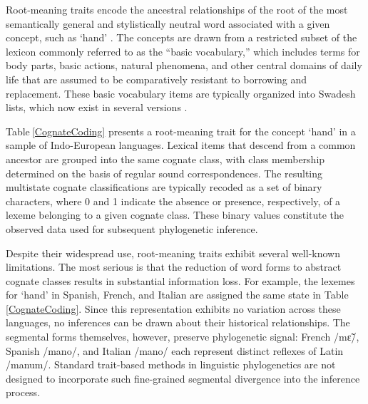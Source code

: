 \documentclass[numsec,webpdf,modern,large,namedate]{oup-authoring-template}
\begin{document}
Root-meaning traits encode the ancestral relationships of the root of the most semantically general and stylistically neutral word associated with a given concept, such as ‘hand’ \citep{Heggarty2023}. The concepts are drawn from a restricted subset of the lexicon commonly referred to as the “basic vocabulary,” which includes terms for body parts, basic actions, natural phenomena, and other central domains of daily life that are assumed to be comparatively resistant to borrowing and replacement. These basic vocabulary items are typically organized into Swadesh lists, which now exist in several versions \citep{Tadmor2010}. 

Table$~$\ref{CognateCoding} presents a root-meaning trait for the concept ‘hand’ in a sample of Indo-European languages. Lexical items that descend from a common ancestor are grouped into the same cognate class, with class membership determined on the basis of regular sound correspondences. The resulting multistate cognate classifications are typically recoded as a set of binary characters, where 0 and 1 indicate the absence or presence, respectively, of a lexeme belonging to a given cognate class. These binary values constitute the observed data used for subsequent phylogenetic inference. 

Despite their widespread use, root-meaning traits exhibit several well-known limitations. The most serious is that the reduction of word forms to abstract cognate classes results in substantial information loss. For example, the lexemes for ‘hand’ in Spanish, French, and Italian are assigned the same state in Table$~$\ref{CognateCoding}. Since this representation exhibits no variation across these languages, no inferences can be drawn about their historical relationships. The segmental forms themselves, however, preserve phylogenetic signal: French /m\~{ɛ}/, Spanish /mano/, and Italian /mano/ each represent distinct reflexes of Latin /manum/. Standard trait-based methods in linguistic phylogenetics are not designed to incorporate such fine-grained segmental divergence into the inference process. 
\end{document}
